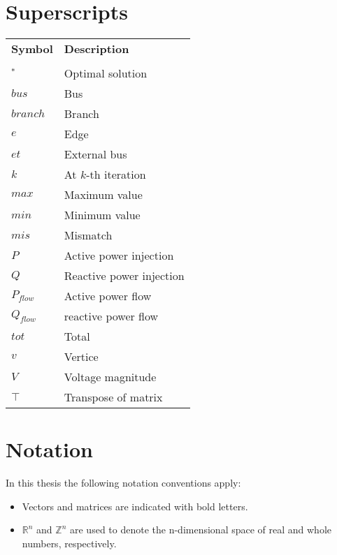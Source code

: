 \section*{Superscripts}
\begin{longtable}[l]{p{\TwoFirstCol} p{\TwoSecondCol}}
\textbf{Symbol}	& \textbf{Description} \\
\smallskip \\
$^*$			& Optimal solution\\
$bus$  & Bus\\
$branch$  & Branch\\
$e$    & Edge\\
$et$    & External bus\\
$k$			& At $k$-th iteration\\
$max$ 	& Maximum value\\
$min$ 	& Minimum value\\
$mis$ 	& Mismatch\\
$P$    & Active power injection\\
$Q$    & Reactive power injection\\
$P_{flow}$    & Active power flow\\
$Q_{flow}$    & reactive power flow\\
$tot$    & Total\\
$v$    & Vertice\\
$V$    & Voltage magnitude\\
$\intercal$  & Transpose of matrix\\

\end{longtable} 

\smallskip
\smallskip

\section*{Notation}
In this thesis the following notation conventions apply:
\begin {itemize}
\item Vectors and matrices are indicated with bold letters.
\item $\mathbb{R}^n$ and $\mathbb{Z}^n$ are used to denote the n-dimensional space of real and whole numbers, respectively.
\end{itemize}


  



\newpage

